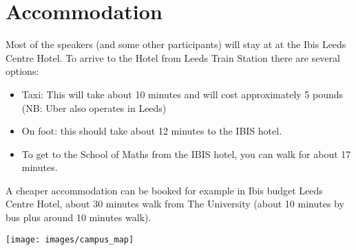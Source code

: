 \section{Accommodation}

Most of the speakers (and some other participants) will stay at at the Ibis Leeds Centre Hotel. To arrive to the Hotel from Leeds Train Station there are several options:
\begin{itemize}
\item Taxi: This will take about 10 minutes and will cost approximately 5 pounds (NB: Uber also operates in Leeds)
\item On foot: this should take about 12 minutes to the IBIS hotel. 
\item To get to the School of Maths from the IBIS hotel, you can walk for about 17 minutes. 
\end{itemize}

A cheaper accommodation can be booked for example in Ibis budget Leeds Centre Hotel, about 30 minutes walk from The University (about 10 minutes by bus plus around 10 minutes walk).

\begin{center}
\texttt{[image: images/campus\_map]}
\end{center}
